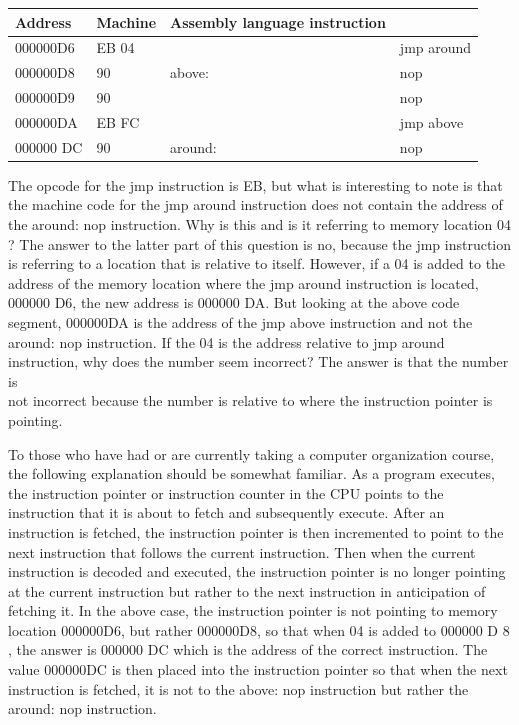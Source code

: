 \documentclass[10pt]{article}
\begin{document}
\begin{center}
\begin{tabular}{|l|l|l|l|}
\hline
Address & Machine & Assembly language instruction &  \\
\hline
000000D6 & EB 04 &  & jmp around \\
\hline
000000D8 & 90 & above: & nop \\
\hline
000000D9 & 90 &  & nop \\
\hline
000000DA & EB FC &  & jmp above \\
\hline
000000 DC & 90 & around: & nop \\
\hline
\end{tabular}
\end{center}

The opcode for the jmp instruction is EB, but what is interesting to note is that the machine code for the jmp around instruction does not contain the address of the around: nop instruction. Why is this and is it referring to memory location 04 ? The answer to the latter part of this question is no, because the jmp instruction is referring to a location that is relative to itself. However, if a 04 is added to the address of the memory location where the jmp around instruction is located, 000000 D6, the new address is 000000 DA. But looking at the above code segment, 000000DA is the address of the jmp above instruction and not the around: nop instruction. If the 04 is the address relative to jmp around instruction, why does the number seem incorrect? The answer is that the number is\\
not incorrect because the number is relative to where the instruction pointer is pointing.

To those who have had or are currently taking a computer organization course, the following explanation should be somewhat familiar. As a program executes, the instruction pointer or instruction counter in the CPU points to the instruction that it is about to fetch and subsequently execute. After an instruction is fetched, the instruction pointer is then incremented to point to the next instruction that follows the current instruction. Then when the current instruction is decoded and executed, the instruction pointer is no longer pointing at the current instruction but rather to the next instruction in anticipation of fetching it. In the above case, the instruction pointer is not pointing to memory location 000000D6, but rather 000000D8, so that when 04 is added to 000000 D 8 , the answer is 000000 DC which is the address of the correct instruction. The value 000000DC is then placed into the instruction pointer so that when the next instruction is fetched, it is not to the above: nop instruction but rather the around: nop instruction.
\end{document}
